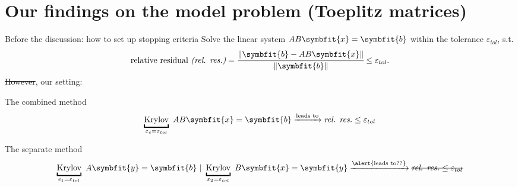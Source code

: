 \documentclass[aspectratio=169]{beamer}
\renewcommand{\bm}{\symbfit}
\begin{document}
\section{Our findings on the model problem (Toeplitz matrices)}
\begin{frame}{Before the discussion: how to set up stopping criteria}
	Solve the linear system $AB \bm{x} = \bm{b}$ within the tolerance $\varepsilon_{tol}$, s.t.
	\begin{equation}\label{toldef}	
		\text{relative residual \textit{(rel. res.)}} = \cfrac{\|\bm{b} - A B \bm{x}\|}{\|\bm{b}\|} \leq \varepsilon_{tol}
	.
	\end{equation}
	\sout{However}, our setting:

	\begin{block}{The combined method}
		\begin{equation*}
			\underbracket{\text{Krylov}}_{\varepsilon_{c} = \varepsilon_{tol}} \text{ } AB \bm{x} = \bm{b}\xrightarrow{\text{leads to}} \textit{rel. res.} \leq \varepsilon_{tol}
		\end{equation*}		
	\end{block}
	\begin{block}{The separate method}
		\begin{equation*}
			\underbracket{\text{Krylov}}_{\epsilon_1 = \varepsilon_{tol}} \text{ } A \bm{y} = \bm{b} \text{ }| \text{ } \underbracket{\text{Krylov}}_{\varepsilon_2 = \varepsilon_{tol}} \text{ } B \bm{x} = \bm{y}\xrightarrow{\alert{\text{leads to??}}}  \hbox{\sout{$\textit{rel. res.} \leq \varepsilon_{tol}$}}
		\end{equation*}	
	\end{block}
\end{frame}
\end{document}
